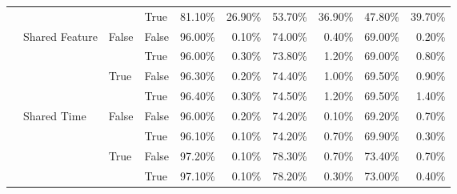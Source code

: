 \begin{tabular}{llllrrrrrr}
 &  &  & True & 81.10\% & 26.90\% & 53.70\% & 36.90\% & 47.80\% & 39.70\% \\
\cline{2-10} \cline{3-10}
 & \multirow[t]{4}{*}{Shared Feature} & \multirow[t]{2}{*}{False} & False & 96.00\% & 0.10\% & 74.00\% & 0.40\% & 69.00\% & 0.20\% \\
 &  &  & True & 96.00\% & 0.30\% & 73.80\% & 1.20\% & 69.00\% & 0.80\% \\
\cline{3-10}
 &  & \multirow[t]{2}{*}{True} & False & 96.30\% & 0.20\% & 74.40\% & 1.00\% & 69.50\% & 0.90\% \\
 &  &  & True & 96.40\% & 0.30\% & 74.50\% & 1.20\% & 69.50\% & 1.40\% \\
\cline{2-10} \cline{3-10}
 & \multirow[t]{4}{*}{Shared Time} & \multirow[t]{2}{*}{False} & False & 96.00\% & 0.20\% & 74.20\% & 0.10\% & 69.20\% & 0.70\% \\
 &  &  & True & 96.10\% & 0.10\% & 74.20\% & 0.70\% & 69.90\% & 0.30\% \\
\cline{3-10}
 &  & \multirow[t]{2}{*}{True} & False & 97.20\% & 0.10\% & 78.30\% & 0.70\% & 73.40\% & 0.70\% \\
 &  &  & True & 97.10\% & 0.10\% & 78.20\% & 0.30\% & 73.00\% & 0.40\% \\
\cline{1-10} \cline{2-10} \cline{3-10}
\bottomrule
\end{tabular}
